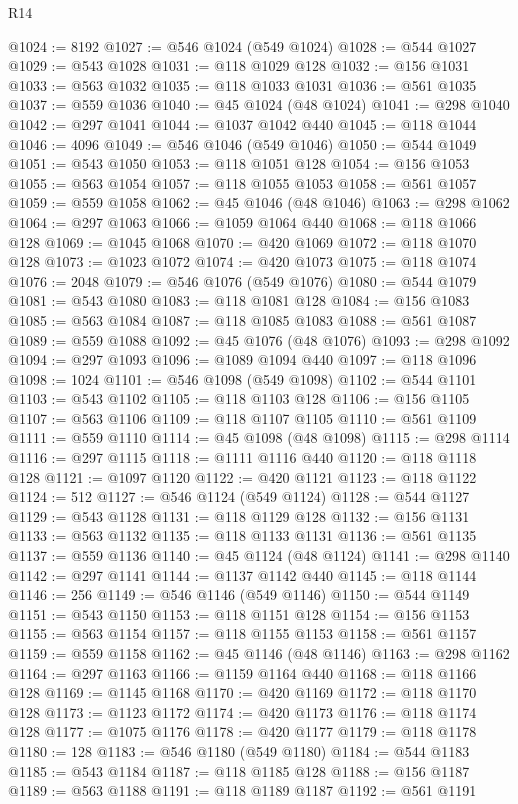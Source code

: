 \begin{lexlean}{R14}
\begin{coremodule}
{{{{{{{{{{{{{{{{{{{{{{{{{{{{{{{{{{{{{{{{{{{{{{{{{{{{{{{{{{{{{{{{{{{{{{{{{{{{{{{{{{@1024 := 8192
@1027 := @546 @1024 (@549 @1024)
@1028 := @544 @1027
@1029 := @543 @1028
@1031 := @118 @1029 @128
@1032 := @156 @1031
@1033 := @563 @1032
@1035 := @118 @1033 @1031
@1036 := @561 @1035
@1037 := @559 @1036
@1040 := @45 @1024 (@48 @1024)
@1041 := @298 @1040
@1042 := @297 @1041
@1044 := @1037 @1042 @440
@1045 := @118 @1044
@1046 := 4096
@1049 := @546 @1046 (@549 @1046)
@1050 := @544 @1049
@1051 := @543 @1050
@1053 := @118 @1051 @128
@1054 := @156 @1053
@1055 := @563 @1054
@1057 := @118 @1055 @1053
@1058 := @561 @1057
@1059 := @559 @1058
@1062 := @45 @1046 (@48 @1046)
@1063 := @298 @1062
@1064 := @297 @1063
@1066 := @1059 @1064 @440
@1068 := @118 @1066 @128
@1069 := @1045 @1068
@1070 := @420 @1069
@1072 := @118 @1070 @128
@1073 := @1023 @1072
@1074 := @420 @1073
@1075 := @118 @1074
@1076 := 2048
@1079 := @546 @1076 (@549 @1076)
@1080 := @544 @1079
@1081 := @543 @1080
@1083 := @118 @1081 @128
@1084 := @156 @1083
@1085 := @563 @1084
@1087 := @118 @1085 @1083
@1088 := @561 @1087
@1089 := @559 @1088
@1092 := @45 @1076 (@48 @1076)
@1093 := @298 @1092
@1094 := @297 @1093
@1096 := @1089 @1094 @440
@1097 := @118 @1096
@1098 := 1024
@1101 := @546 @1098 (@549 @1098)
@1102 := @544 @1101
@1103 := @543 @1102
@1105 := @118 @1103 @128
@1106 := @156 @1105
@1107 := @563 @1106
@1109 := @118 @1107 @1105
@1110 := @561 @1109
@1111 := @559 @1110
@1114 := @45 @1098 (@48 @1098)
@1115 := @298 @1114
@1116 := @297 @1115
@1118 := @1111 @1116 @440
@1120 := @118 @1118 @128
@1121 := @1097 @1120
@1122 := @420 @1121
@1123 := @118 @1122
@1124 := 512
@1127 := @546 @1124 (@549 @1124)
@1128 := @544 @1127
@1129 := @543 @1128
@1131 := @118 @1129 @128
@1132 := @156 @1131
@1133 := @563 @1132
@1135 := @118 @1133 @1131
@1136 := @561 @1135
@1137 := @559 @1136
@1140 := @45 @1124 (@48 @1124)
@1141 := @298 @1140
@1142 := @297 @1141
@1144 := @1137 @1142 @440
@1145 := @118 @1144
@1146 := 256
@1149 := @546 @1146 (@549 @1146)
@1150 := @544 @1149
@1151 := @543 @1150
@1153 := @118 @1151 @128
@1154 := @156 @1153
@1155 := @563 @1154
@1157 := @118 @1155 @1153
@1158 := @561 @1157
@1159 := @559 @1158
@1162 := @45 @1146 (@48 @1146)
@1163 := @298 @1162
@1164 := @297 @1163
@1166 := @1159 @1164 @440
@1168 := @118 @1166 @128
@1169 := @1145 @1168
@1170 := @420 @1169
@1172 := @118 @1170 @128
@1173 := @1123 @1172
@1174 := @420 @1173
@1176 := @118 @1174 @128
@1177 := @1075 @1176
@1178 := @420 @1177
@1179 := @118 @1178
@1180 := 128
@1183 := @546 @1180 (@549 @1180)
@1184 := @544 @1183
@1185 := @543 @1184
@1187 := @118 @1185 @128
@1188 := @156 @1187
@1189 := @563 @1188
@1191 := @118 @1189 @1187
@1192 := @561 @1191
}}}}}}}}}}}}}}}}}}}}}}}}}}}}}}}}}}}}}}}}}}}}}}}}}}}}}}}}}}}}}}}}}}}}}}}}}}}}}}}}}}
\end{coremodule}
\end{lexlean}
